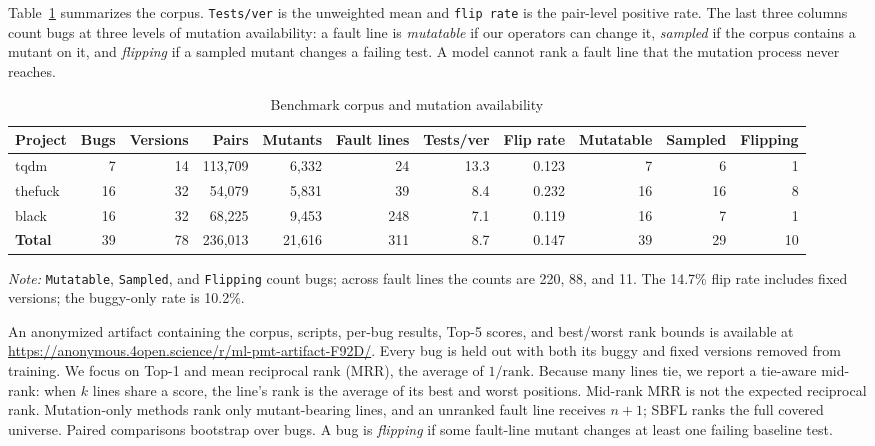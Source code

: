 \documentclass[10pt,conference]{IEEEtran}
\begin{document}
Table~\ref{tab:corpus} summarizes the corpus. \texttt{Tests/ver} is the unweighted mean and \texttt{flip rate} is the pair-level positive rate. The last three columns count bugs at three levels of mutation availability: a fault line is \emph{mutatable} if our operators can change it, \emph{sampled} if the corpus contains a mutant on it, and \emph{flipping} if a sampled mutant changes a failing test. A model cannot rank a fault line that the mutation process never reaches.

\begin{table}[t]
\centering
\caption{Benchmark corpus and mutation availability}
\label{tab:corpus}
\footnotesize
\begin{tabular}{lrrrrrrr|rrr}
\toprule
Project & Bugs & Versions & Pairs & Mutants & Fault lines & Tests/ver & Flip rate & Mutatable & Sampled & Flipping \\
\midrule
tqdm & 7 & 14 & 113,709 & 6,332 & 24 & 13.3 & 0.123 & 7 & 6 & 1 \\
thefuck & 16 & 32 & 54,079 & 5,831 & 39 & 8.4 & 0.232 & 16 & 16 & 8 \\
black & 16 & 32 & 68,225 & 9,453 & 248 & 7.1 & 0.119 & 16 & 7 & 1 \\
\midrule
\textbf{Total} & 39 & 78 & 236,013 & 21,616 & 311 & 8.7 & 0.147 & 39 & 29 & 10 \\
\bottomrule
\end{tabular}

\vspace{2mm}
\parbox{0.8\textwidth}{\footnotesize
\textit{Note:} \texttt{Mutatable}, \texttt{Sampled}, and \texttt{Flipping} count bugs; across fault lines the counts are 220, 88, and 11. The 14.7\% flip rate includes fixed versions; the buggy-only rate is 10.2\%.
}

\end{table}

An anonymized artifact containing the corpus, scripts, per-bug results, Top-5 scores, and best/worst rank bounds is available at \url{https://anonymous.4open.science/r/ml-pmt-artifact-F92D/}. Every bug is held out with both its buggy and fixed versions removed from training. We focus on Top-1 and mean reciprocal rank (MRR), the average of $1/\text{rank}$. Because many lines tie, we report a tie-aware mid-rank: when $k$ lines share a score, the line's rank is the average of its best and worst positions. Mid-rank MRR is not the expected reciprocal rank. Mutation-only methods rank only mutant-bearing lines, and an unranked fault line receives $n+1$; SBFL ranks the full covered universe. Paired comparisons bootstrap over bugs. A bug is \emph{flipping} if some fault-line mutant changes at least one failing baseline test.
\end{document}
